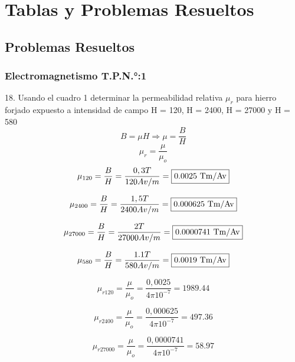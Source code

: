 \documentclass[../main]{subfiles}
\begin{document}
\chapter{Tablas y Problemas Resueltos}
\section{Problemas Resueltos}
\subsection{Electromagnetismo T.P.N.°:1}
\newcommand{\cuadro}[1]{\fbox{#1}}
18. Usando el cuadro 1 determinar la permeabilidad relativa $\mu_r$ para
hierro forjado expuesto a
intensidad de campo H = 120, H = 2400, H = 27000 y H = 580
\begin{equation}
  B=\mu H \Rightarrow \mu=\frac{B}{H}
\end{equation}
\begin{equation}
  \mu_r= \frac{\mu}{\mu_o}
\end{equation}
\begin{equation}
  \mu_{120}=\frac{B}{H}= \frac{0,3T}{120Av/m}= \cuadro{0.0025 Tm/Av}
\end{equation}

\begin{equation}
  \mu_{2400}=\frac{B}{H}= \frac{1,5T}{2400Av/m}= \cuadro{0.000625 Tm/Av}
\end{equation}

\begin{equation}
  \mu_{27000}=\frac{B}{H}= \frac{2T}{27000Av/m}= \cuadro{0.0000741 Tm/Av}
\end{equation}

\begin{equation}
  \mu_{580}=\frac{B}{H}= \frac{1.1T}{580Av/m}= \cuadro{0.0019 Tm/Av}
\end{equation}

\begin{equation}
  \mu_{r120}=\frac{\mu}{\mu_o}= \frac{0,0025}{4\pi 10^{-7}}=
  1989.44
\end{equation}

\begin{equation}
  \mu_{r2400}=\frac{\mu}{\mu_o}= \frac{0,000625}{4\pi 10^{-7}}=
  497.36
\end{equation}

\begin{equation}
  \mu_{r27000}=\frac{\mu}{\mu_o}= \frac{0,0000741}{4\pi 10^{-7}}=
  58.97
\end{equation}
\end{document}
